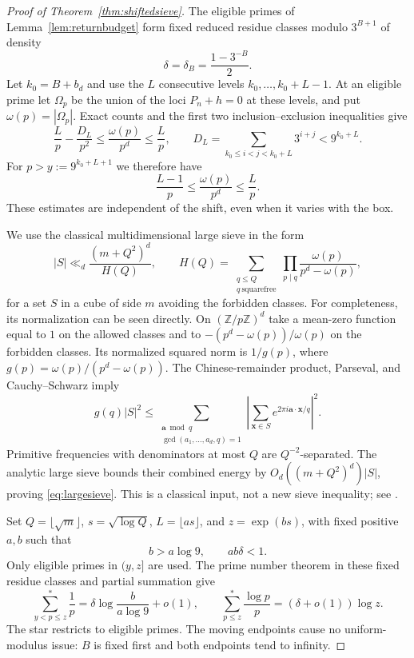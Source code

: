 \documentclass[11pt,a4paper]{article}
\theoremstyle{remark}\newtheorem{remark}[theorem]{Remark}
\newcommand{\Z}{\mathbb Z}\newcommand{\Q}{\mathbb Q}
\begin{document}
\begin{proof}[Proof of Theorem~\ref{thm:shiftedsieve}]
The eligible primes of Lemma~\ref{lem:returnbudget} form fixed
reduced residue classes modulo $3^{B+1}$ of density
\[
 \delta=\delta_B=\frac{1-3^{-B}}2.
\]
Let $k_0=B+b_d$ and use the $L$ consecutive levels
$k_0,\ldots,k_0+L-1$. At an eligible prime let $\Omega_p$ be the
union of the loci $P_n+h=0$ at these levels, and put
$\omega(p)=|\Omega_p|$. Exact counts and the first two
inclusion--exclusion inequalities give
\[
 \frac Lp-\frac{D_L}{p^2}\le\frac{\omega(p)}{p^d}\le\frac Lp,
 \qquad
 D_L=\sum_{k_0\le i<j<k_0+L}3^{i+j}<9^{k_0+L}.
\]
For $p>y:=9^{k_0+L+1}$ we therefore have
\begin{equation}\label{eq:uniformforbidden}
 \frac{L-1}{p}\le\frac{\omega(p)}{p^d}\le\frac Lp.
\end{equation}
These estimates are independent of the shift, even when it varies
with the box.

We use the classical multidimensional large sieve in the form
\begin{equation}\label{eq:largesieve}
 |S|\ll_d\frac{(m+Q^2)^d}{H(Q)},\qquad
 H(Q)=\sum_{\substack{q\le Q\\q\ {\text{squarefree}}}}
 \prod_{p\mid q}\frac{\omega(p)}{p^d-\omega(p)},
\end{equation}
for a set $S$ in a cube of side $m$ avoiding the forbidden classes.
For completeness, its normalization can be seen directly. On
$(\Z/p\Z)^d$ take a mean-zero function equal to $1$ on the allowed
classes and to $-(p^d-\omega(p))/\omega(p)$ on the forbidden classes.
Its normalized squared norm is $1/g(p)$, where
$g(p)=\omega(p)/(p^d-\omega(p))$. The Chinese-remainder product,
Parseval, and Cauchy--Schwarz imply
\[
 g(q)|S|^2\le
 \sum_{\substack{\mathbf a\bmod q\\
 \gcd(a_1,\ldots,a_d,q)=1}}
 \left|\sum_{\mathbf x\in S}e^{2\pi i\mathbf a\cdot\mathbf x/q}\right|^2.
\]
Primitive frequencies with denominators at most $Q$ are
$Q^{-2}$-separated. The analytic large sieve bounds their combined
energy by $O_d((m+Q^2)^d)|S|$, proving
\eqref{eq:largesieve}. This is a classical input, not a new sieve
inequality; see \cite{Kowalski}.

Set $Q=\lfloor\sqrt m\rfloor$, $s=\sqrt{\log Q}$,
$L=\lfloor a s\rfloor$, and $z=\exp(bs)$, with fixed positive
$a,b$ such that
\[
 b>a\log9,\qquad ab\delta<1.
\]
Only eligible primes in $(y,z]$ are used. The prime number theorem
in these fixed residue classes and partial summation give
\[
 \sum_{y<p\le z}^{*}\frac1p
 =\delta\log\frac{b}{a\log9}+o(1),\qquad
 \sum_{p\le z}^{*}\frac{\log p}{p}=(\delta+o(1))\log z.
\]
The star restricts to eligible primes. The moving endpoints cause
no uniform-modulus issue: $B$ is fixed first and both endpoints
tend to infinity.


\end{proof}
\end{document}
